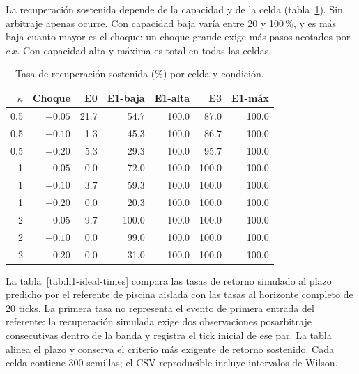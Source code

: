 La recuperación sostenida depende de la capacidad y de la celda (tabla~\ref{tab:recuperacion}). Sin arbitraje apenas ocurre. Con capacidad baja varía entre 20 y 100\,\%, y es más baja cuanto mayor es el choque: un choque grande exige más pasos acotados por $c\,x$. Con capacidad alta y máxima es total en todas las celdas.

\begin{table}[htbp]
\centering
\caption{Tasa de recuperación sostenida (\%) por celda y condición.}
\label{tab:recuperacion}
\small
\begin{tabular}{@{}rrrrrrr@{}}
\toprule
$\kappa$ & Choque & E0 & E1-baja & E1-alta & E3 & E1-máx \\
\midrule
0.5 & $-0.05$ & 21.7 & 54.7 & 100.0 & 87.0 & 100.0 \\
0.5 & $-0.10$ & 1.3 & 45.3 & 100.0 & 86.7 & 100.0 \\
0.5 & $-0.20$ & 5.3 & 29.3 & 100.0 & 95.7 & 100.0 \\
1 & $-0.05$ & 0.0 & 72.0 & 100.0 & 100.0 & 100.0 \\
1 & $-0.10$ & 3.7 & 59.3 & 100.0 & 100.0 & 100.0 \\
1 & $-0.20$ & 0.0 & 20.3 & 100.0 & 100.0 & 100.0 \\
2 & $-0.05$ & 9.7 & 100.0 & 100.0 & 100.0 & 100.0 \\
2 & $-0.10$ & 0.0 & 99.0 & 100.0 & 100.0 & 100.0 \\
2 & $-0.20$ & 0.0 & 31.0 & 100.0 & 100.0 & 100.0 \\
\bottomrule
\end{tabular}
\end{table}

La tabla~\ref{tab:h1-ideal-times} compara las tasas de retorno simulado al plazo predicho por el referente de piscina aislada con las tasas al horizonte completo de 20 ticks. La primera tasa no representa el evento de primera entrada del referente: la recuperación simulada exige dos observaciones posarbitraje consecutivas dentro de la banda y registra el tick inicial de ese par. La tabla alinea el plazo y conserva el criterio más exigente de retorno sostenido. Cada celda contiene 300 semillas; el CSV reproducible incluye intervalos de Wilson.

